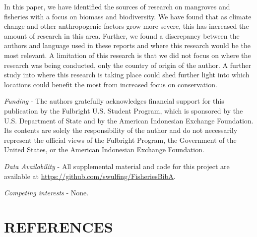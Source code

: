 \documentclass[
  12pt,
]{article}
\begin{document}
In this paper, we have identified the sources of research on mangroves and fisheries with a focus on biomass and biodiversity. We have found that as climate change and other anthropogenic factors grow more severe, this has increased the amount of research in this area. Further, we found a discrepancy between the authors and language used in these reports and where this research would be the most relevant. A limitation of this research is that we did not focus on where the research was being conducted, only the country of origin of the author. A further study into where this research is taking place could shed further light into which locations could benefit the most from increased focus on conservation.

\emph{Funding} - The authors gratefully acknowledges financial support for this publication by the Fulbright U.S. Student Program, which is sponsored by the U.S. Department of State and by the American Indonesian Exchange Foundation. Its contents are solely the responsibility of the author and do not necessarily represent the official views of the Fulbright Program, the Government of the United States, or the American Indonesian Exchange Foundation.

\emph{Data Availability} - All supplemental material and code for this project are available at \url{https://github.com/swulfing/FisheriesBibA}.

\emph{Competing interests} - None.

\newpage

\section*{REFERENCES}\label{references}
\end{document}
